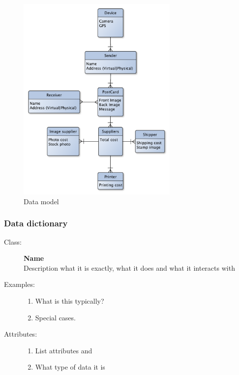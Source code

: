 \documentclass[10pt,a4paper]{article}
\begin{document}
\begin{figure}[h!]
\centering
\includegraphics[width=0.7\textwidth]{Data_figures/DataModel.pdf}
\caption{Data model}
\label{fig:datamodel}
\end{figure}

\subsubsection{Data dictionary}

\begin{description}
\item[Class:] \textbf{Name} \hfill \\
Description what it is exactly, what it does and what it interacts with

\item[Examples:] \hfill
\begin{enumerate}
\item What is this typically?
\item Special cases.
\end{enumerate}

\item[Attributes:] \hfill
\begin{enumerate}
\item List attributes and 
\item What type of data it is
\end{enumerate}
\end{description}
\end{document}
